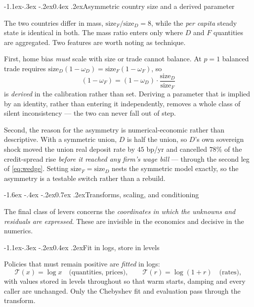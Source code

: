 \documentclass[10pt,a4paper]{article}
\makeatletter
\theoremstyle{definition}
\theoremstyle{plain}
\theoremstyle{remark}
\renewcommand\section{\@startsection{section}{1}{\z@}%
  {-1.6ex \@plus -.4ex \@minus -.2ex}{0.7ex \@plus.2ex}{\normalfont\large\bfseries}}
\renewcommand\subsection{\@startsection{subsection}{2}{\z@}%
  {-1.1ex\@plus -.3ex \@minus -.2ex}{0.4ex \@plus .2ex}{\normalfont\normalsize\bfseries}}
\makeatother
\begin{document}
\subsection{Asymmetric country size and a derived parameter}

The two countries differ in mass, $\text{size}_F/\text{size}_D = 8$, while the \emph{per
capita} steady state is identical in both. The mass ratio enters only where $D$ and $F$
quantities are aggregated. Two features are worth noting as technique.

First, home bias \emph{must} scale with size or trade cannot balance. At $p=1$ balanced trade
requires $\text{size}_D(1-\omega_D) = \text{size}_F(1-\omega_F)$, so
\begin{equation}
  (1-\omega_F) = (1-\omega_D)\cdot\frac{\text{size}_D}{\text{size}_F}
\end{equation}
is \emph{derived} in the calibration rather than set. Deriving a parameter that is implied by
an identity, rather than entering it independently, removes a whole class of silent
inconsistency --- the two can never fall out of step.

Second, the reason for the asymmetry is numerical-economic rather than descriptive. With a
symmetric union, $D$ is half the union, so $D$'s own sovereign shock moved the union real
deposit rate by $45$ bp/yr and cancelled $78\%$ of the credit-spread rise \emph{before it
reached any firm's wage bill} --- through the second leg of \eqref{eq:wedge}. Setting
$\text{size}_F = \text{size}_D$ nests the symmetric model exactly, so the asymmetry is a
testable switch rather than a rebuild.

\section{Transforms, scaling, and conditioning}
\label{sec:transforms}

The final class of levers concerns the \emph{coordinates in which the unknowns and residuals
are expressed}. These are invisible in the economics and decisive in the numerics.

\subsection{Fit in logs, store in levels}

Policies that must remain positive are \emph{fitted} in logs:
\begin{equation}
  \mathcal{T}(x) = \log x \quad\text{(quantities, prices)},\qquad
  \mathcal{T}(r) = \log(1+r)\quad\text{(rates)},
\end{equation}
with values stored in levels throughout so that warm starts, damping and every caller are
unchanged. Only the Chebyshev fit and evaluation pass through the transform.
\end{document}
